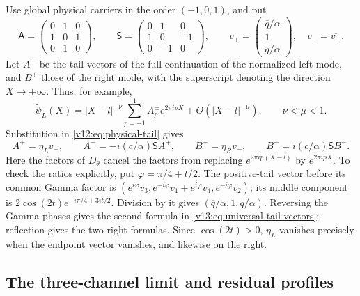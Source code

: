 Use global physical carriers in the order $(-1,0,1)$, and put
\[
 \mathsf A=\begin{pmatrix}0&1&0\\1&0&1\\0&1&0\end{pmatrix},
 \qquad
 \mathsf S=\begin{pmatrix}0&1&0\\1&0&-1\\0&-1&0\end{pmatrix},
\qquad v_+=\begin{pmatrix}\overline q/\alpha\\1\\q/\alpha\end{pmatrix},
 \quad v_-=\overline{v_+}.
\]
Let $A^\pm$ be the tail vectors of the full continuation of the
normalized left mode, and $B^\pm$ those of the right mode, with the
superscript denoting the direction $X\to\pm\infty$.  Thus, for example,
\[
 \widetilde\psi_L(X)=|X-l|^{-\nu}
       \sum_{p=-1}^1 A_p^\pm e^{2\pi ipX}+O(|X-l|^{-\mu}),
 \qquad \nu<\mu<1.
\]
Substitution in \eqref{v12:eq:physical-tail} gives
\begin{equation}\label{v13:eq:universal-tail-vectors}
 A^+=\eta_Lv_+,\qquad A^-=-i(c/\alpha)\mathsf SA^+,
 \qquad B^-=\eta_Rv_-,\qquad B^+=i(c/\alpha)\mathsf SB^-.
\end{equation}
Here the factors of $D_\theta$ cancel the factors from replacing
$e^{2\pi ip(X-l)}$ by $e^{2\pi ipX}$.  To check the ratios explicitly,
put $\varphi=\pi/4+t/2$.  The positive-tail vector before its common
Gamma factor is
$(e^{i\varphi}v_3,e^{-i\varphi}v_1+e^{i\varphi}v_4,
e^{-i\varphi}v_2)$; its middle component is
$2\cos(2t)e^{-i\pi/4+3it/2}$.  Division by it gives
$(\overline q/\alpha,1,q/\alpha)$.  Reversing the Gamma phases gives the
second formula in \eqref{v13:eq:universal-tail-vectors}; reflection
gives the two right formulas.  Since $\cos(2t)>0$, $\eta_L$ vanishes
precisely when the endpoint vector vanishes, and likewise on the right.

\subsection{The three-channel limit and residual profiles}

